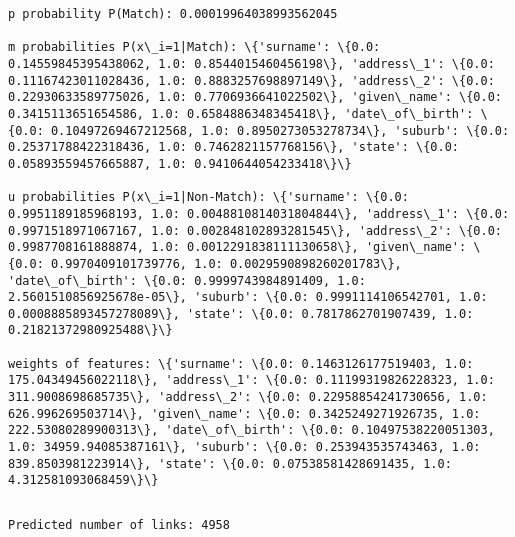 \documentclass{article}
\begin{document}
    \begin{Verbatim}[commandchars=\\\{\}]
p probability P(Match): 0.00019964038993562045

m probabilities P(x\_i=1|Match): \{'surname': \{0.0: 0.14559845395438062, 1.0: 0.8544015460456198\}, 'address\_1': \{0.0: 0.11167423011028436, 1.0: 0.8883257698897149\}, 'address\_2': \{0.0: 0.22930633589775026, 1.0: 0.7706936641022502\}, 'given\_name': \{0.0: 0.3415113651654586, 1.0: 0.6584886348345418\}, 'date\_of\_birth': \{0.0: 0.10497269467212568, 1.0: 0.8950273053278734\}, 'suburb': \{0.0: 0.25371788422318436, 1.0: 0.7462821157768156\}, 'state': \{0.0: 0.05893559457665887, 1.0: 0.9410644054233418\}\}

u probabilities P(x\_i=1|Non-Match): \{'surname': \{0.0: 0.9951189185968193, 1.0: 0.0048810814031804844\}, 'address\_1': \{0.0: 0.9971518971067167, 1.0: 0.002848102893281545\}, 'address\_2': \{0.0: 0.9987708161888874, 1.0: 0.0012291838111130658\}, 'given\_name': \{0.0: 0.9970409101739776, 1.0: 0.0029590898260201783\}, 'date\_of\_birth': \{0.0: 0.9999743984891409, 1.0: 2.5601510856925678e-05\}, 'suburb': \{0.0: 0.9991114106542701, 1.0: 0.0008885893457278089\}, 'state': \{0.0: 0.7817862701907439, 1.0: 0.21821372980925488\}\}

weights of features: \{'surname': \{0.0: 0.1463126177519403, 1.0: 175.04349456022118\}, 'address\_1': \{0.0: 0.11199319826228323, 1.0: 311.9008698685735\}, 'address\_2': \{0.0: 0.22958854241730656, 1.0: 626.996269503714\}, 'given\_name': \{0.0: 0.3425249271926735, 1.0: 222.53080289900313\}, 'date\_of\_birth': \{0.0: 0.10497538220051303, 1.0: 34959.94085387161\}, 'suburb': \{0.0: 0.253943535743463, 1.0: 839.8503981223914\}, 'state': \{0.0: 0.07538581428691435, 1.0: 4.312581093068459\}\}

    \end{Verbatim}

    \begin{Verbatim}[commandchars=\\\{\}]

\end{Verbatim}

    \begin{Verbatim}[commandchars=\\\{\}]
Predicted number of links: 4958

    \end{Verbatim}

    \begin{Verbatim}[commandchars=\\\{\}]

\end{Verbatim}
\end{document}
